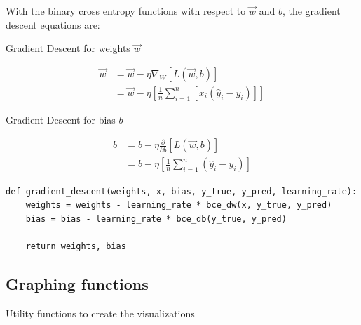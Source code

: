 \documentclass[openany]{book}
\begin{document}
With the binary cross entropy functions with respect to \(\vec{w}\) and
\(b\), the gradient descent equations are:

    Gradient Descent for weights \(\vec{w}\)

\begin{align*}
\vec{w} &= \vec{w} - \eta \nabla_{W} [L(\vec{w}, b)] \\
&= \vec{w} - \eta [\frac{1}{n} \sum_{i=1}^{n} [x_i (\hat y_i - y_i)]]
\end{align*}

    Gradient Descent for bias \(b\)

\begin{align*}
b &= b - \eta \frac{\partial}{\partial b} [L(\vec{w}, b)] \\
&= b - \eta [\frac{1}{n} \sum_{i=1}^{n} (\hat y_i - y_i)]
\end{align*}

\begin{tcolorbox}
\tiny
\begin{verbatim}
def gradient_descent(weights, x, bias, y_true, y_pred, learning_rate):
    weights = weights - learning_rate * bce_dw(x, y_true, y_pred)
    bias = bias - learning_rate * bce_db(y_true, y_pred)

    return weights, bias
\end{verbatim}
\end{tcolorbox}

    \subsection{Graphing functions}\label{graphing-functions}

Utility functions to create the visualizations
\end{document}
